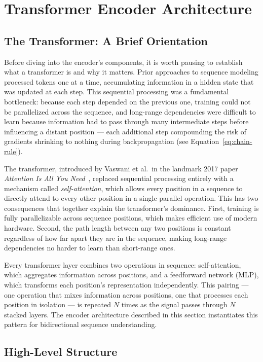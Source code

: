 \documentclass{book}
\begin{document}
\section{Transformer Encoder Architecture}

\subsection{The Transformer: A Brief Orientation}

Before diving into the encoder's components, it is worth pausing to establish
what a transformer is and why it matters. Prior approaches to sequence modeling
processed tokens one at a time, accumulating information in a hidden state that
was updated at each step. This sequential processing was a fundamental
bottleneck: because each step depended on the previous one, training could not
be parallelized across the sequence, and long-range dependencies were difficult
to learn because information had to pass through many intermediate steps before
influencing a distant position --- each additional step compounding the risk of
gradients shrinking to nothing during backpropagation
(see Equation~\ref{eq:chain-rule}).

The transformer, introduced by Vaswani et al.\ in the landmark 2017 paper
\textit{Attention Is All You Need}~\cite{vaswani2017attention}, replaced
sequential processing entirely with a mechanism called \emph{self-attention},
which allows every position in a sequence to directly attend to every other
position in a single parallel operation. This has two consequences that
together explain the transformer's dominance. First, training is fully
parallelizable across sequence positions, which makes efficient use of modern
hardware. Second, the path length between any two positions is constant
regardless of how far apart they are in the sequence, making long-range
dependencies no harder to learn than short-range ones.

Every transformer layer combines two operations in sequence: self-attention,
which aggregates information across positions, and a feedforward network (MLP),
which transforms each position's representation independently. This pairing ---
one operation that mixes information across positions, one that processes each
position in isolation --- is repeated $N$ times as the signal passes through
$N$ stacked layers. The encoder architecture described in this section
instantiates this pattern for bidirectional sequence understanding.

\subsection{High-Level Structure}
\label{sec:encoder}
\end{document}
